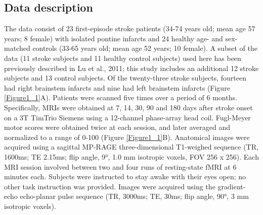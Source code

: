 \documentclass[phd,tocprelim]{cornell}
\begin{document}
	\subsection{Data description}
	 The data consist of 23 first-episode stroke patients (34-74 years old; mean age 57 years; 8 female) with isolated pontine infarcts and 24 healthy age- and sex-matched controls (33-65 years old; mean age 52 years; 10 female). A subset of the data (11 stroke subjects and 11 healthy control subjects) used here has been previously described in Lu et al., 2011; this study includes an additional 12 stroke subjects and 13 control subjects. Of the twenty-three stroke subjects, fourteen  had right brainstem infarcts and nine had left brainstem infarcts (Figure \ref{Figure1_1}A). Patients were scanned five times over a period of 6 months. Specifically, MRIs were obtained at 7, 14, 30, 90 and 180 days after stroke onset on a 3T TimTrio Siemens using a 12-channel phase-array head coil. Fugl-Meyer motor scores were obtained twice at each session, and later averaged and normalized to a range of 0-100 (Figure \ref{Figure1_1}B). Anatomical images were acquired using a sagittal MP-RAGE three-dimensional T1-weighed sequence (TR, 1600ms; TE 2.15ms; flip angle, 9°, 1.0 mm isotropic voxels, FOV 256 x 256). Each MRI session involved between two and four runs of resting-state fMRI at 6 minutes each. Subjects were instructed to stay awake with their eyes open; no other task instruction was provided. Images were acquired using the gradient-echo echo-planar pulse sequence (TR, 3000ms; TE, 30ms; flip angle, 90°, 3 mm isotropic voxels).
\end{document}
